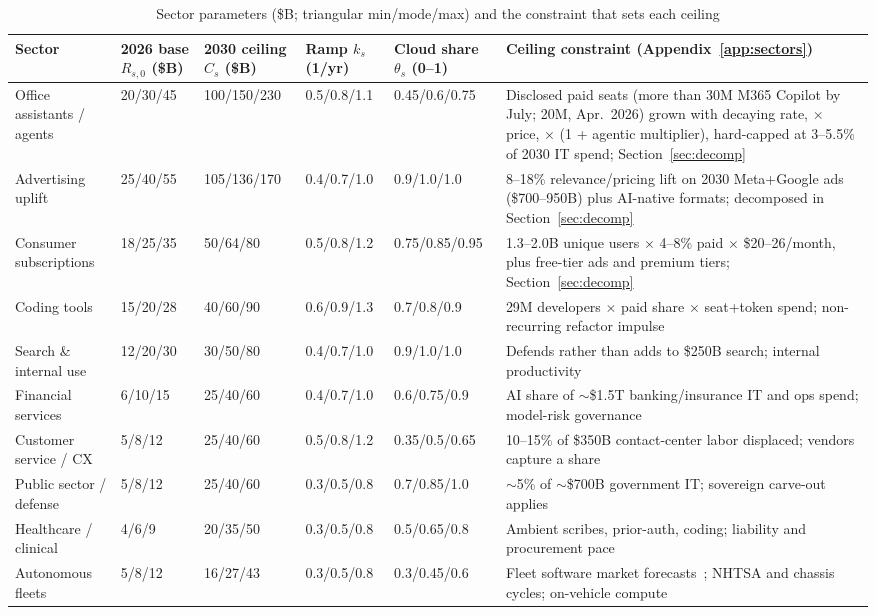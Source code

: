 \documentclass[11pt,letterpaper]{article}
\begin{document}
\begin{table}[htbp]
\centering\scriptsize
\caption{Sector parameters (\$B; triangular min/mode/max) and the constraint that sets each ceiling}
\label{tab:sectors}
\begin{tabularx}{\textwidth}{L{2.9cm}L{1.6cm}L{1.9cm}L{1.5cm}L{1.6cm}X}
\toprule
\textbf{Sector} & \textbf{2026 base $R_{s,0}$ (\$B)} & \textbf{2030 ceiling $C_s$ (\$B)} & \textbf{Ramp $k_s$ (1/yr)} & \textbf{Cloud share $\theta_s$ (0--1)} & \textbf{Ceiling constraint (Appendix~\ref{app:sectors})} \\
\midrule
Office assistants / agents & 20/30/45 & 100/150/230 & 0.5/0.8/1.1 & 0.45/0.6/0.75 & Disclosed paid seats (more than 30M M365 Copilot by July; 20M, Apr.~2026) grown with decaying rate, $\times$ price, $\times$ (1 + agentic multiplier), hard-capped at 3--5.5\% of 2030 IT spend; Section~\ref{sec:decomp} \\
Advertising uplift & 25/40/55 & 105/136/170 & 0.4/0.7/1.0 & 0.9/1.0/1.0 & 8--18\% relevance/pricing lift on 2030 Meta+Google ads (\$700--950B) plus AI-native formats; decomposed in Section~\ref{sec:decomp} \\
Consumer subscriptions & 18/25/35 & 50/64/80 & 0.5/0.8/1.2 & 0.75/0.85/0.95 & 1.3--2.0B unique users $\times$ 4--8\% paid $\times$ \$20--26/month, plus free-tier ads and premium tiers; Section~\ref{sec:decomp} \\
Coding tools & 15/20/28 & 40/60/90 & 0.6/0.9/1.3 & 0.7/0.8/0.9 & 29M developers $\times$ paid share $\times$ seat+token spend; non-recurring refactor impulse \\
Search \& internal use & 12/20/30 & 30/50/80 & 0.4/0.7/1.0 & 0.9/1.0/1.0 & Defends rather than adds to \$250B search; internal productivity \\
Financial services & 6/10/15 & 25/40/60 & 0.4/0.7/1.0 & 0.6/0.75/0.9 & AI share of $\sim$\$1.5T banking/insurance IT and ops spend; model-risk governance \\
Customer service / CX & 5/8/12 & 25/40/60 & 0.5/0.8/1.2 & 0.35/0.5/0.65 & 10--15\% of \$350B contact-center labor displaced; vendors capture a share \\
Public sector / defense & 5/8/12 & 25/40/60 & 0.3/0.5/0.8 & 0.7/0.85/1.0 & $\sim$5\% of $\sim$\$700B government IT; sovereign carve-out applies \\
Healthcare / clinical & 4/6/9 & 20/35/50 & 0.3/0.5/0.8 & 0.5/0.65/0.8 & Ambient scribes, prior-auth, coding; liability and procurement pace \\
Autonomous fleets & 5/8/12 & 16/27/43 & 0.3/0.5/0.8 & 0.3/0.45/0.6 & Fleet software market forecasts~\cite{ref:av_fbi}; NHTSA and chassis cycles; on-vehicle compute \\

\end{tabularx}
\end{table}
\end{document}
